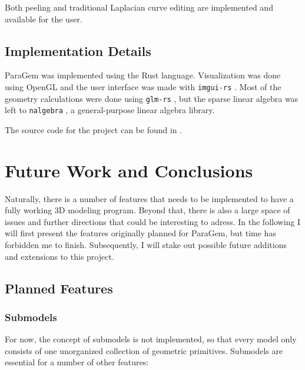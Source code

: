 \documentclass[english]{article}
\begin{document}
Both peeling and traditional Laplacian curve editing are implemented and available for the user.

\subsection{Implementation Details}


ParaGem was implemented using the Rust language. Visualization was done using OpenGL and the user interface was made with \texttt{imgui-rs} \cite{imguirs}. Most of the geometry calculations were done using \texttt{glm-rs} \cite{glmrs}, but the sparse linear algebra was left to \texttt{nalgebra} \cite{nalgebra}, a general-purpose linear algebra library.

The source code for the project can be found in \cite{paragem}.

\pagebreak

\section{Future Work and Conclusions} \label{section_future_work}


Naturally, there is a number of features that needs to be implemented to have a fully working 3D modeling program. Beyond that, there is also a large space of issues and further directions that could be interesting to adress. In the following I will first present the features originally planned for ParaGem, but time has forbidden me to finish. Subsequently, I will stake out possible future additions and extensions to this project.

\subsection{Planned Features}

\subsubsection{Submodels}


For now, the concept of submodels is not implemented, so that every model only consists of one unorganized collection of geometric primitives. Submodels are essential for a number of other features:
\end{document}

